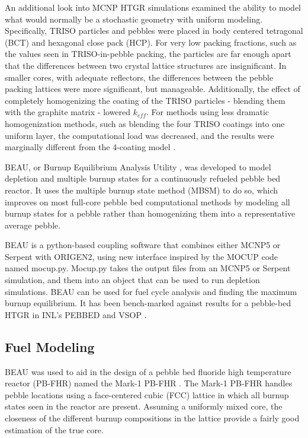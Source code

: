 An additional look into MCNP HTGR simulations examined the ability to model what would normally be a stochastic geometry with uniform modeling.  Specifically, TRISO particles and pebbles were placed in body centered tetragonal (BCT) and hexagonal close pack (HCP).  For very low packing fractions, such as the values seen in TRISO-in-pebble packing, the particles are far enough apart that the differences between two crystal lattice structures are insignificant.  In smaller cores, with adequate reflectors, the differences between the pebble packing lattices were more significant, but manageable.  Additionally, the effect of completely homogenizing the coating of the TRISO particles - blending them with the graphite matrix - lowered $k_{eff}$.  For methods using less dramatic homogenization methods, such as blending the four TRISO coatings into one uniform layer, the computational load was decreased, and the results were marginally different from the 4-coating model \cite{karriem_mcnp_2001}.

BEAU, or Burnup Equilibrium Analysis Utility \cite{cisneros_pebble_2013}, was developed to model depletion and multiple burnup states for a continuously refueled pebble bed reactor. It uses the multiple burnup state method (MBSM) to do so, which improves on most full-core pebble bed computational methods by modeling all burnup states for a pebble rather than homogenizing them into a representative average pebble.

BEAU is a python-based coupling software that combines either MCNP5 or Serpent with ORIGEN2, using new interface inspired by the MOCUP code named mocup.py.  Mocup.py takes the output files from an MCNP5 or Serpent simulation, and them into an object that can be used to run depletion simulations.  BEAU can be used for fuel cycle analysis and finding the maximum burnup equilibrium.  It has been bench-marked against results for a pebble-bed HTGR in INL's PEBBED and VSOP \cite{cisneros_pebble_2013}.

\subsection{Fuel Modeling}

BEAU was used to aid in the design of a pebble bed fluoride high temperature reactor (PB-FHR) named the Mark-1 PB-FHR \cite{cisneros_pebble_2013}.  The Mark-1 PB-FHR handles pebble locations using a face-centered cubic (FCC) lattice in which all burnup states seen in the reactor are present.  Assuming a uniformly mixed core, the closeness of the different burnup compositions in the lattice provide a fairly good estimation of the true core.

